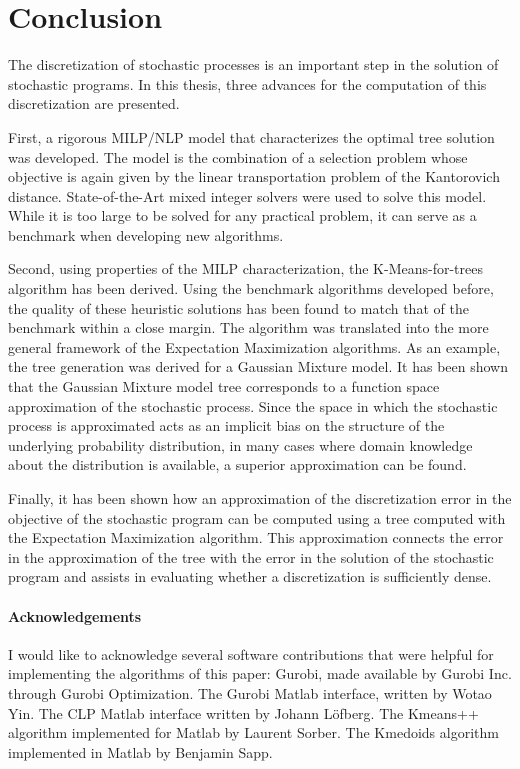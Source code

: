 \section{Conclusion}
The discretization of stochastic processes is an important step in the solution of stochastic programs. In this thesis, three advances for the computation of this discretization are presented.

First, a rigorous MILP/NLP model that characterizes the optimal tree solution was developed. The model is the combination of a selection problem whose objective is again given by the linear transportation problem of the Kantorovich distance. State-of-the-Art mixed integer solvers were used to solve this model. While it is too large to be solved for any practical problem, it can serve as a benchmark when developing new algorithms.

Second, using properties of the MILP characterization, the K-Means-for-trees algorithm has been derived. Using the benchmark algorithms developed before, the quality of these heuristic solutions has been found to match that of the benchmark within a close margin. The algorithm was translated into the more general framework of the Expectation Maximization algorithms. As an example, the tree generation was derived for a Gaussian Mixture model. It has been shown that the Gaussian Mixture model tree corresponds to a function space approximation of the stochastic process. Since the space in which the stochastic process is approximated acts as an implicit bias on the structure of the underlying probability distribution, in many cases where domain knowledge about the distribution is available, a superior approximation can be found.

Finally, it has been shown how an approximation of the discretization error in the objective of the stochastic program can be computed using a tree computed with the Expectation Maximization algorithm. This approximation connects the error in the approximation of the tree with the error in the solution of the stochastic program and assists in evaluating whether a discretization is sufficiently dense.


\paragraph{Acknowledgements}
I would like to acknowledge several software contributions that were helpful for implementing the algorithms of this paper: Gurobi, made available by Gurobi Inc. through Gurobi Optimization. The Gurobi Matlab interface, written by Wotao Yin. The CLP Matlab interface written by Johann L\"{o}fberg. The Kmeans++ algorithm implemented for Matlab by Laurent Sorber. The Kmedoids algorithm implemented in Matlab by Benjamin Sapp.
